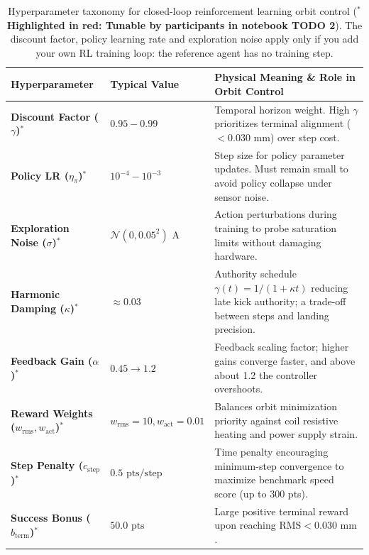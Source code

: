 \documentclass[11pt,a4paper]{article}
\begin{document}
\begin{table}[h!]
\centering
\small
\begin{tabular}{@{}p{3.2cm} p{2.6cm} p{9.2cm}@{}}
\toprule
\textbf{Hyperparameter} & \textbf{Typical Value} & \textbf{Physical Meaning \& Role in Orbit Control} \\
\midrule
\textbf{\color{tunablered}Discount Factor ($\gamma$)$^*$} & $0.95 - 0.99$ & Temporal horizon weight. High $\gamma$ prioritizes terminal alignment ($< 0.030\text{ mm}$) over step cost. \\
\textbf{\color{tunablered}Policy LR ($\eta_\pi$)$^*$} & $10^{-4} - 10^{-3}$ & Step size for policy parameter updates. Must remain small to avoid policy collapse under sensor noise. \\
\textbf{\color{tunablered}Exploration Noise ($\sigma$)$^*$} & $\mathcal{N}(0, 0.05^2)\text{ A}$ & Action perturbations during training to probe saturation limits without damaging hardware. \\
\textbf{\color{tunablered}Harmonic Damping ($\kappa$)$^*$} & $\approx 0.03$ & Authority schedule $\gamma(t) = 1/(1+\kappa t)$ reducing late kick authority; a trade-off between steps and landing precision. \\
\textbf{\color{tunablered}Feedback Gain ($\alpha$)$^*$} & $0.45 \to 1.2$ & Feedback scaling factor; higher gains converge faster, and above about 1.2 the controller overshoots. \\
\textbf{\color{tunablered}Reward Weights ($w_{\text{rms}}, w_{\text{act}}$)$^*$} & $w_{\text{rms}}=10, w_{\text{act}}=0.01$ & Balances orbit minimization priority against coil resistive heating and power supply strain. \\
\textbf{\color{tunablered}Step Penalty ($c_{\text{step}}$)$^*$} & $0.5\text{ pts/step}$ & Time penalty encouraging minimum-step convergence to maximize benchmark speed score (up to 300 pts). \\
\textbf{\color{tunablered}Success Bonus ($b_{\text{term}}$)$^*$} & $50.0\text{ pts}$ & Large positive terminal reward upon reaching $\text{RMS} < 0.030\text{ mm}$. \\
\bottomrule
\end{tabular}
\caption{Hyperparameter taxonomy for closed-loop reinforcement learning orbit control (\textbf{\color{tunablered}$^*$Highlighted in red: Tunable by participants in notebook TODO 2}). The discount factor, policy learning rate and exploration noise apply only if you add your own RL training loop: the reference agent has no training step.}
\label{tab:rl_hyperparams}
\end{table}
\end{document}
